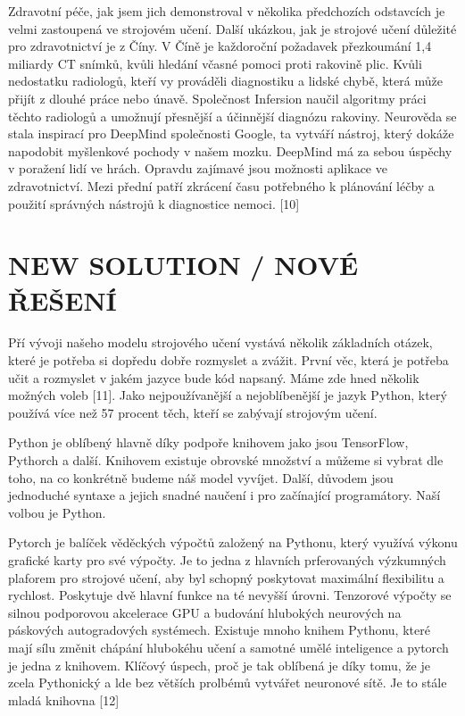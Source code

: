 \documentclass[journal]{IEEEtran}
\begin{document}
Zdravotní péče, jak jsem jich demonstroval v několika předchozích odstavcích je velmi zastoupená ve strojovém učení.  Další ukázkou, jak je strojové učení důležité pro zdravotnictví je z Číny. V Číně je každoroční požadavek přezkoumání 1,4 miliardy CT snímků, kvůli hledání včasné pomoci proti rakovině plic. Kvůli nedostatku radiologů, kteří vy prováděli diagnostiku a lidské chybě, která může přijít z dlouhé práce nebo únavě. Společnost Infersion naučil algoritmy práci těchto radiologů a umožnují přesnější a účinnější diagnózu rakoviny. 
Neurověda se stala inspirací pro DeepMind společnosti Google, ta vytváří nástroj, který dokáže napodobit myšlenkové pochody v našem mozku. DeepMind má za sebou úspěchy v poražení lidí ve hrách. Opravdu zajímavé jsou možnosti aplikace ve zdravotnictví. Mezi přední patří zkrácení času potřebného k plánování léčby a použití správných nástrojů k diagnostice nemoci. [10]

\section{NEW SOLUTION / NOVÉ ŘEŠENÍ}

Pří vývoji našeho modelu strojového učení vystává několik základních otázek, které je potřeba si dopředu dobře rozmyslet a zvážit. První věc, která je potřeba učit a rozmyslet v jakém jazyce bude kód napsaný.  Máme zde hned několik možných voleb [11]. Jako nejpoužívanější a nejoblíbenější je jazyk Python, který používá více než 57 procent těch, kteří se zabývají strojovým učení. 

Python je oblíbený hlavně díky podpoře knihovem jako jsou TensorFlow, Pythorch a další. Knihovem existuje obrovské množství a můžeme si vybrat dle toho, na co konkrétně budeme náš model vyvíjet. Další, důvodem jsou jednoduché syntaxe a jejich snadné naučení i pro začínající programátory. Naší volbou je Python.

Pytorch je balíček věděckých výpočtů založený na Pythonu, který využívá výkonu grafické karty pro své výpočty. Je to jedna z hlavních prferovaných výzkumných plaforem pro strojové učení, aby byl schopný poskytovat maximální flexibilitu a rychlost. Poskytuje dvě hlavní funkce na té nevyšší úrovni. Tenzorové výpočty se silnou podporovou akcelerace GPU a budování hlubokých neurových na páskových autogradových systémech. Existuje mnoho knihem Pythonu, které mají sílu změnit chápání hlubokéhu učení a samotné umělé inteligence a pytorch je jedna z knihovem. Klíčový úspech, proč je tak oblíbená je díky tomu, že je zcela Pythonický a lde bez větších prolbémů vytvářet  neuronové sítě. Je to stále mladá knihovna [12]
\end{document}
